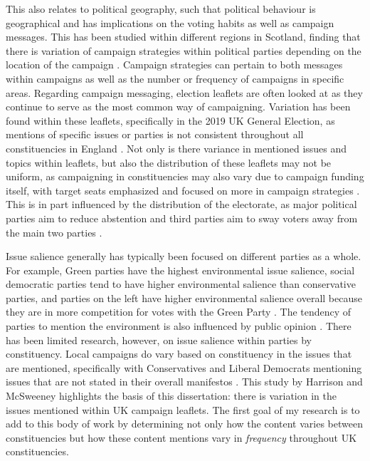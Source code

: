 \documentclass[12pt,letterpaper]{article}
\begin{document}
This also relates to political geography, such that political behaviour is geographical and has implications on the voting habits as well as campaign messages. This has been studied within different regions in Scotland, finding that there is variation of campaign strategies within political parties depending on the location of the campaign \autocite{pringleClassicsHumanGeography2003,agasosterPartyCohesionLocal2001}. Campaign strategies can pertain to both messages within campaigns as well as the number or frequency of campaigns in specific areas. Regarding campaign messaging, election leaflets are often looked at as they continue to serve as the most common way of campaigning. Variation has been found within these leaflets, specifically in the 2019 UK General Election, as mentions of specific issues or parties is not consistent throughout all constituencies in England  \autocite{trummParliamentaryCandidatesTheir2023a}. Not only is there variance in mentioned issues and topics within leaflets, but also the distribution of these leaflets may not be uniform, as campaigning in constituencies may also vary due to campaign funding itself, with target seats emphasized and focused on more in campaign strategies \autocite{pattieResourcingConstituencyCampaign2016}. This is in part influenced by the distribution of the electorate, as major political parties aim to reduce abstention and third parties aim to sway voters away from the main two parties \autocite{nunezEffectsLocalCampaigning2021}.

Issue salience generally has typically been focused on different parties as a whole. For example, Green parties have the highest environmental issue salience, social democratic parties tend to have higher environmental salience than conservative parties, and parties on the left have higher environmental salience overall because they are in more competition for votes with the Green Party \autocite{carterGreeningMainstreamParty2013}. The tendency of parties to mention the environment is also influenced by public opinion \autocite{carterPartyPoliticizationEnvironment2006}. There has been limited research, however, on issue salience within parties by constituency. Local campaigns do vary based on constituency in the issues that are mentioned, specifically with Conservatives and Liberal Democrats mentioning issues that are not stated in their overall manifestos \autocite{harrisonNationalLocalParty2008}. This study by Harrison and McSweeney highlights the basis of this dissertation: there is variation in the issues mentioned within UK campaign leaflets. The first goal of my research is to add to this body of work by determining not only how the content varies between constituencies but how these content mentions vary in \textit{frequency} throughout UK constituencies.
\end{document}
